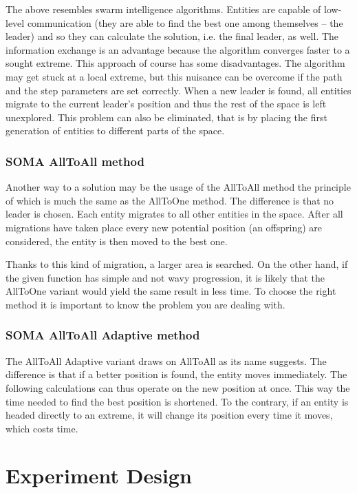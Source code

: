 \documentclass[review]{elsarticle}
\begin{document}
The above resembles swarm intelligence algorithms. Entities are capable of low-level communication (they are able to find the best one among themselves -- the leader) and so they can calculate the solution, i.e. the final leader, as well. The information exchange is an advantage because the algorithm converges faster to a sought extreme. This approach of course has some disadvantages. The algorithm may get stuck at a local extreme, but this nuisance can be overcome if the path and the step parameters are set correctly. When a new leader is found, all entities migrate to the current leader's position and thus the rest of the space is left unexplored. This problem can also be eliminated, that is by placing the first generation of entities to different parts of the space.

\subsubsection{SOMA AllToAll method}
Another way to a solution may be the usage of the AllToAll method the principle of which is much the same as the AllToOne method. The difference is that no leader is chosen. Each entity migrates to all other entities in the space. After all migrations have taken place every new potential position (an offspring) are considered, the entity is then moved to the best one. 

Thanks to this kind of migration, a larger area is searched. On the other hand, if the given function has simple and not wavy progression, it is likely that the AllToOne variant would yield the same result in less time. To choose the right method it is important to know the problem you are dealing with. 

\subsubsection{SOMA AllToAll Adaptive method}
The AllToAll Adaptive variant draws on AllToAll as its name suggests. The difference is that if a better position is found, the entity moves immediately. The following calculations can thus operate on the new position at once. This way the time needed to find the best position is shortened. To the contrary, if an entity is headed directly to an extreme, it will change its position every time it moves, which costs time.

\section{Experiment Design}
\end{document}
